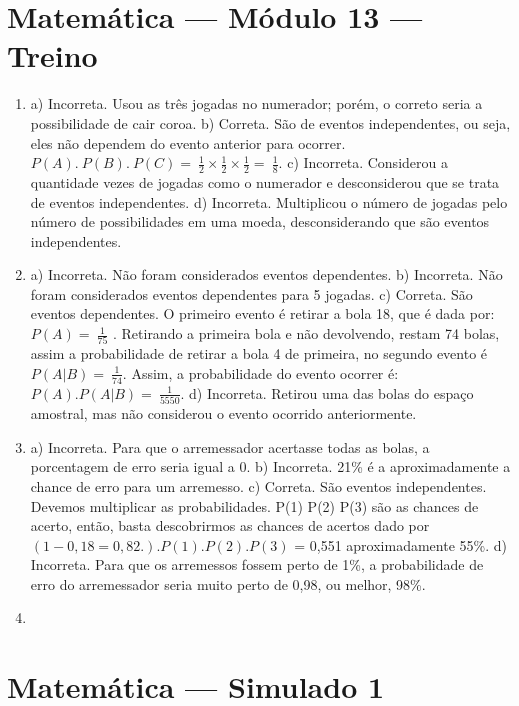\section*{Matemática — Módulo 13 — Treino}

\begin{enumerate}
\item a) Incorreta. Usou as três jogadas no numerador;  porém, o correto
seria a possibilidade de cair coroa.
b) Correta. São de eventos independentes, ou seja, eles não
dependem do evento anterior para ocorrer. $P(A).\ P(B).\ P(C) = \ \frac{1}{2} \times \frac{1}{2} \times \frac{1}{2} = \ \frac{1}{8}$.
c) Incorreta. Considerou a quantidade vezes de jogadas como o
numerador e desconsiderou que se trata de eventos independentes.
d) Incorreta. Multiplicou o número de jogadas pelo número de
possibilidades em uma moeda, desconsiderando que são eventos
independentes.

\item a) Incorreta. Não foram considerados eventos dependentes.
b) Incorreta. Não foram considerados eventos dependentes para 5
jogadas.
c) Correta. São eventos dependentes. O primeiro evento é retirar a
bola 18, que é dada por: $P(A) = \ \frac{1}{75}$ . Retirando a
primeira bola e não devolvendo, restam 74 bolas, assim a probabilidade
de retirar a bola 4 de primeira, no segundo evento é
$P(A|B) = \ \frac{1}{74}$. Assim, a probabilidade do evento ocorrer é:
$P(A).P(A|B) = \ \frac{1}{5550}$.
d) Incorreta. Retirou uma das bolas do espaço amostral, mas não
considerou o evento ocorrido anteriormente.

\item a) Incorreta. Para que o arremessador acertasse todas as bolas, a
porcentagem de erro seria igual a 0.
b) Incorreta. 21\% é a aproximadamente a chance de erro para um
arremesso.
c) Correta. São eventos independentes. Devemos multiplicar as
probabilidades. P(1) P(2) P(3) são as chances de acerto, então, basta
descobrirmos as chances de acertos dado por $(1 - 0,18 = 0,82.). P(1).P(2).P(3)$ = 0,551 aproximadamente 55\%.
d) Incorreta. Para que os arremessos fossem perto de 1\%, a
probabilidade de erro do arremessador seria muito perto de 0,98, ou
melhor, 98\%.
\item 
\end{enumerate}


\section*{Matemática — Simulado 1}

